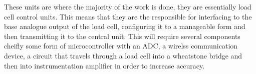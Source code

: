 These units are where the majority of the work is done, they are essentially load cell control units. This means that they are the responsible for interfacing to the base analogue output of the load cell, configuring it to a manageable form and then transmitting it to the central unit. This will require several components cheifly some form of microcontroller with an ADC, a wirelss communication device, a circuit that travels through a load cell into a wheatstone bridge and then into instrumentation amplifier in order to increase accuracy. 